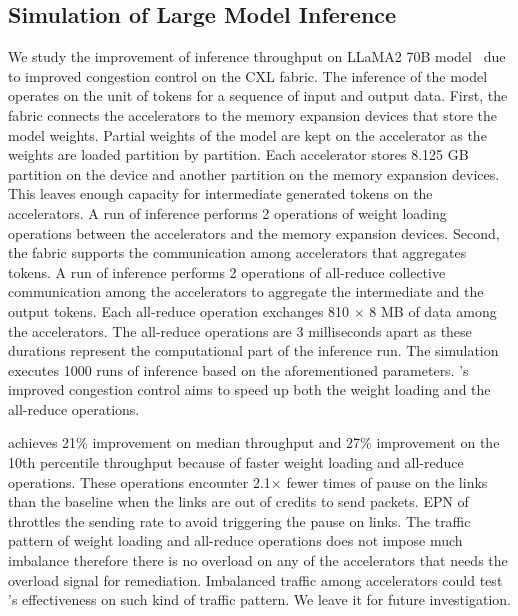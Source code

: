 \subsection{Simulation of Large Model Inference}
\label{aurelia:sec:eval:inf}
%
We study the improvement of inference throughput on LLaMA2 70B model~\cite{llama:arxiv:2023} due to improved congestion control on the CXL fabric.
%
The inference of the model operates on the unit of tokens for a sequence of input and output data.
%
First, the fabric connects the accelerators to the memory expansion devices that store the model weights.
%
Partial weights of the model are kept on the accelerator as the weights are loaded partition by partition.  
%
Each accelerator stores 8.125 GB partition on the device and another partition on the memory expansion devices.
%
This leaves enough capacity for intermediate generated tokens on the accelerators.
%
A run of inference performs 2 operations of weight loading operations between the accelerators and the memory expansion devices.
%
Second, the fabric supports the communication among accelerators that aggregates tokens.
%
A run of inference performs 2 operations of all-reduce collective communication among the accelerators to aggregate the intermediate and the output tokens.
%
Each all-reduce operation exchanges 810 $\times$ 8 MB of data among the accelerators.
%
The all-reduce operations are 3 milliseconds apart as these durations represent the computational part of the inference run.
%
The simulation executes 1000 runs of inference based on the aforementioned parameters.  
%
\aurelia's improved congestion control aims to speed up both the weight loading and the all-reduce operations.
%

\aurelia achieves 21\% improvement on median throughput and 27\% improvement on the 10th percentile throughput because of faster weight loading and all-reduce operations.
%
These operations encounter 2.1$\times$ fewer times of pause on the links than the baseline when the links are out of credits to send packets.
%
EPN of \aurelia throttles the sending rate to avoid triggering the pause on links. 
%
The traffic pattern of weight loading and all-reduce operations does not impose much imbalance therefore there is no overload on any of the accelerators that needs the overload signal for remediation.
%
Imbalanced traffic among accelerators could test \aurelia's effectiveness on such kind of traffic pattern. 
%
We leave it for future investigation.

